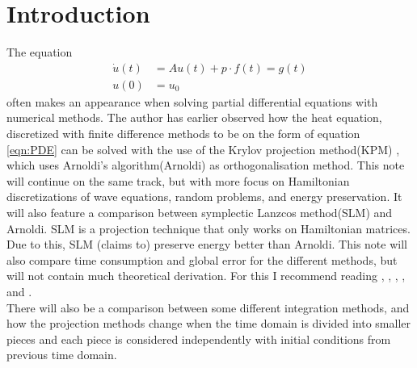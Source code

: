 \chapter{Introduction}

The equation 
\begin{equation} 
\begin{aligned}
\dot{u}(t) &= A u(t) + p \cdot f(t) = g(t) \\
u(0)&= u_0
\end{aligned}
\label{eqn:PDE}
\end{equation}
often makes an appearance when solving partial differential equations with numerical methods. The author has earlier observed how the heat equation, discretized with finite difference methods to be on the form of equation \eqref{eqn:PDE} can be solved with the use of the Krylov projection method(KPM) \cite{min}, which uses Arnoldi's algorithm(Arnoldi) as orthogonalisation method. This note will continue on the same track, but with more focus on Hamiltonian discretizations of wave equations, random problems, and energy preservation. It will also feature a comparison between symplectic Lanzcos method(SLM) \cite{SLM} and Arnoldi. SLM is a projection technique that only works on Hamiltonian matrices. Due to this, SLM (claims to) preserve energy better than Arnoldi. This note will also compare time consumption and global error for the different methods, but will not contain much theoretical derivation. For this I recommend reading \cite{elena}, \cite{min}, \cite{SLM}, \cite{SLMO}, and \cite{luli}. \\

There will also be a comparison between some different integration methods, and how the projection methods change when the time domain is divided into smaller pieces and each piece is considered independently with initial conditions from previous time domain.



